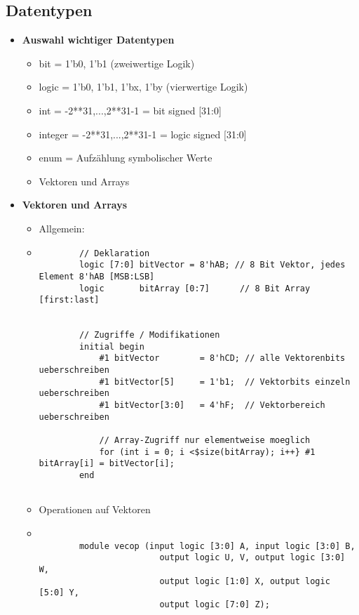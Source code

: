 \subsection{Datentypen}
\begin{itemize}

\item \textbf{Auswahl wichtiger Datentypen}
	\begin{itemize}
	\item bit = {1'b0, 1'b1} (zweiwertige Logik)
	\item logic = {1'b0, 1'b1, 1'bx, 1'by} (vierwertige Logik)
	\item int = {-2**31,...,2**31-1} = bit signed [31:0]
	\item integer = {-2**31,...,2**31-1} = logic signed [31:0]
	\item enum = Aufzählung symbolischer Werte
	\item Vektoren und Arrays
	\end{itemize}
	
\item \textbf{Vektoren und Arrays}
	\begin{itemize}
	\item Allgemein:
	\item[]
		\begin{lstlisting}
		// Deklaration
		logic [7:0] bitVector = 8'hAB; // 8 Bit Vektor, jedes Element 8'hAB [MSB:LSB]
		logic 		bitArray [0:7] 		// 8 Bit Array [first:last]
		
		
		// Zugriffe / Modifikationen
		initial begin 
			#1 bitVector  		= 8'hCD; // alle Vektorenbits ueberschreiben
			#1 bitVector[5] 	= 1'b1;	 // Vektorbits einzeln ueberschreiben
			#1 bitVector[3:0]	= 4'hF;	 // Vektorbereich ueberschreiben
			
			// Array-Zugriff nur elementweise moeglich
			for (int i = 0; i <$size(bitArray); i++} #1 bitArray[i] = bitVector[i];
		end
		
		\end{lstlisting}
		
\pagebreak		
		
	\item Operationen auf Vektoren
	\item[]
		\begin{lstlisting}
		
		module vecop (input logic [3:0] A, input logic [3:0] B,
						output logic U, V, output logic [3:0] W,
						output logic [1:0] X, output logic [5:0] Y,
						output logic [7:0] Z);
			

\end{lstlisting}
\end{itemize}
\end{itemize}
